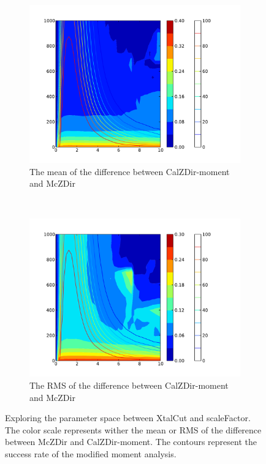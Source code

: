 \documentclass[11pt]{article}
\begin{document}
\begin{figure}
        \centering
        \begin{subfigure}[b]{0.5\textwidth}
                \centering
                \includegraphics[width=\textwidth]{mean}
                \caption{The mean of the difference between CalZDir-moment and McZDir}
                \label{para_mean}
        \end{subfigure}%
        ~ %
        \begin{subfigure}[b]{0.5\textwidth}
                \centering
                \includegraphics[width=\textwidth]{rms}
                \caption{The RMS of the difference between CalZDir-moment and McZDir}
                \label{para_rms}
        \end{subfigure}
        \caption{Exploring the parameter space between XtalCut and scaleFactor.  The color scale represents wither the mean or RMS of the difference between McZDir and CalZDir-moment.  The contours represent the success rate of the modified moment analysis.  }
        \label{para}
\end{figure}
\end{document}
